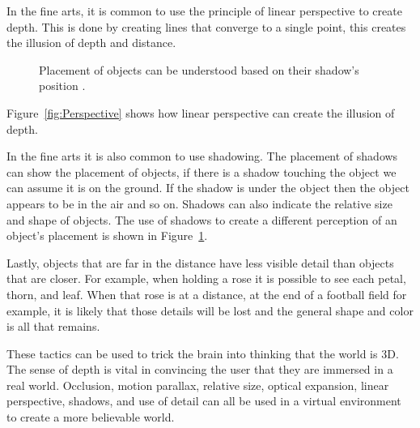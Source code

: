 In the fine arts, it is common to use the principle of linear perspective to create depth. This is done by creating lines that converge to a single point, this creates the illusion of depth and distance. 
\begin{figure}[!ht]
	\begin{center}
	\end{center}
	\caption{Placement of objects can be understood based on their shadow's position \cite{LaValle2017}.} \label{fig:shadows}
\end{figure}Figure~\ref{fig:Perspective} shows how linear perspective can create the illusion of depth. 


In the fine arts it is also common to use shadowing. The placement of shadows can show the placement of objects, if there is a shadow touching the object we can assume it is on the ground. If the shadow is under the object then the object appears to be in the air and so on. Shadows can also indicate the relative size and shape of objects. The use of shadows to create a different perception of an object's placement is shown in Figure~\ref{fig:shadows}. 


Lastly, objects that are far in the distance have less visible detail than objects that are closer. For example, when holding a rose it is possible to see each petal, thorn, and leaf. When that rose is at a distance, at the end of a football field for example, it is likely that those details will be lost and the general shape and color is all that remains. 


These tactics can be used to trick the brain into thinking that the world is 3D. The sense of depth is vital in convincing the user that they are immersed in a real world. Occlusion, motion parallax, relative size, optical expansion, linear perspective, shadows, and use of detail can all be used in a virtual environment to create a more believable world. 


